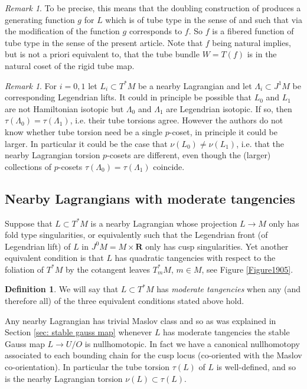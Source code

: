 \documentclass{amsart}
\def\bR{\mathbf{R}}
\theoremstyle{definition}
\newtheorem{definition}[theorem]{Definition}
\theoremstyle{remark}
\newtheorem{inductive lemma}[theorem]{Inductive Lemma}
\newtheorem{remark}[theorem]{Remark}
\begin{document}
\begin{remark}
To be precise, this means that the doubling construction of \cite{ACGK} produces a generating function $g$ for $L$ which is of tube type in the sense of \cite{ACGK} and such that via the modification of \cite{AACK} the function $g$ corresponds to $f$. So $f$ is a fibered function of tube type in the sense of the present article. Note that $f$ being natural implies, but is not a priori equivalent to, that the tube bundle $W=T(f)$ is in the natural coset of the rigid tube map. 
\end{remark}

\begin{remark}
For $i=0,1$ let $L_i \subset T^*M$ be a nearby Lagrangian and let $\Lambda_i \subset J^1M$ be corresponding Legendrian lifts. It could in principle be possible that $L_0$ and $L_1$ are not Hamiltonian isotopic but $\Lambda_0$ and $\Lambda_1$ are Legendrian isotopic. If so, then $\tau(\Lambda_0)=\tau(\Lambda_1)$, i.e. their tube torsions agree. However the authors do not know whether tube torsion need be a single $p$-coset, in principle it could be larger. In particular it could be the case that $\nu(L_0) \neq \nu(L_1)$, i.e. that the nearby Lagrangian torsion $p$-cosets are different, even though the (larger) collections of $p$-cosets $\tau(\Lambda_0)=\tau(\Lambda_1)$ coincide.
\end{remark}

\subsection{Nearby Lagrangians with moderate tangencies}\label{sec: gen nl mod}


Suppose that $L \subset T^*M$ is a nearby Lagrangian whose projection $L \to M$ only has fold type singularities, or equivalently such that the Legendrian front (of Legendrian lift) of $L$ in $J^0M =M \times \bR$ only has cusp singularities. Yet another equivalent condition is that $L$ has quadratic tangencies with respect to the foliation of $T^*M$ by the cotangent leaves $T_m^*M$, $m \in M$, see Figure \ref{Figure1905}.


\begin{definition} We will say that $L \subset T^*M$ has {\em moderate tangencies} when any (and therefore all) of the three equivalent conditions stated above hold. \end{definition}

Any nearby Lagrangian has trivial Maslov class \cite{A12} and so as was explained in Section \ref{sec: stable gauss map} whenever $L$ has moderate tangencies the stable Gauss map $L \to U/O$ is nullhomotopic. In fact we have a canonical nullhomotopy associated to each bounding chain for the cusp locus (co-oriented with the Maslov co-orientation).  In particular the tube torsion $\tau(L)$ of $L$ is well-defined, and so is the nearby Lagrangian torsion $\nu(L) \subset \tau(L)$. 
\end{document}
